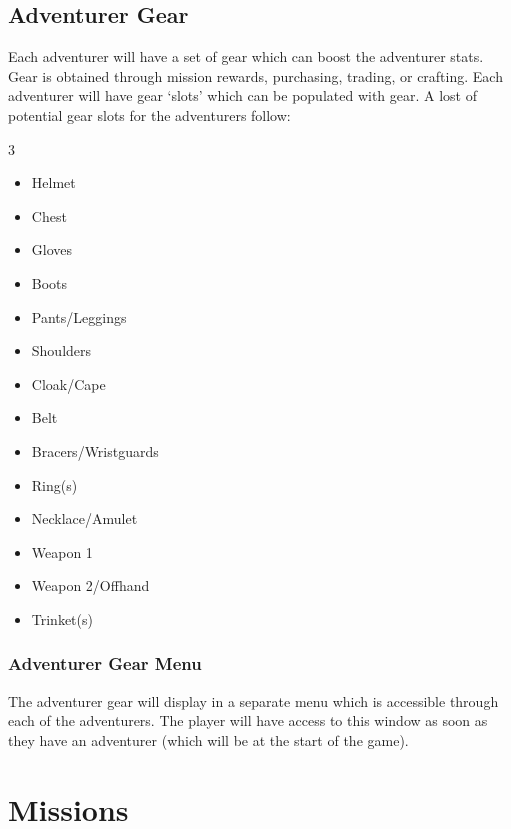 \subsection{Adventurer Gear}

Each adventurer will have a set of gear which can boost the adventurer stats. Gear is obtained through mission rewards, purchasing, trading, or crafting. Each adventurer will have gear `slots' which can be populated with gear. A lost of potential gear slots for the adventurers follow:

\begin{multicols}{3}
    \begin{itemize}[noitemsep, topsep=0pt]
        \item Helmet
        \item Chest
        \item Gloves
        \item Boots
        \item Pants/Leggings
        \item Shoulders
        \item Cloak/Cape
        \item Belt
        \item Bracers/Wristguards
        \item Ring(s)
        \item Necklace/Amulet
        \item Weapon 1
        \item Weapon 2/Offhand
        \item Trinket(s)
    \end{itemize}
\end{multicols}

\subsubsection{Adventurer Gear Menu}

The adventurer gear will display in a separate menu which is accessible through each of the adventurers. The player will have access to this window as soon as they have an adventurer (which will be at the start of the game).







\section{Missions}

